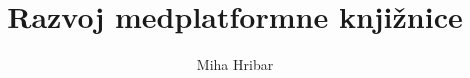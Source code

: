 \documentclass[slovene,BUNRI,twoside]{FRIthesis}
\title[LaTeX predloga][LaTeX thesis class]
      {Razvoj medplatformne knjižnice}{Developing a cross platform library}
\author{Miha Hribar}{63010042}
\begin{document}
\maketitle
\makecopyright
\thesistopic
\makedeclaration

\frontmatter
 
 
 \tableofcontents 

\mainmatter
 
 
 
 
 
\end{document}
